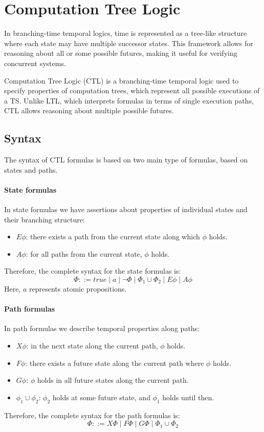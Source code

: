 \section{Computation Tree Logic}

In branching-time temporal logics, time is represented as a tree-like structure where each state may have multiple successor states. 
This framework allows for reasoning about all or some possible futures, making it useful for verifying concurrent systems.

Computation Tree Logic (CTL) is a branching-time temporal logic used to specify properties of computation trees, which represent all possible executions of a TS. 
Unlike LTL, which interprets formulas in terms of single execution paths, CTL allows reasoning about multiple possible futures.

\subsection{Syntax}
The syntax of CTL formulas is based on two main type of formulas, based on states and paths. 

\paragraph*{State formulas}
In state formulas we have assertions about properties of individual states and their branching structure: 
\begin{itemize}
    \item $E\phi$: there exists a path from the current state along which $\phi$ holds.
    \item $A\phi$: for all paths from the current state, $\phi$ holds.
\end{itemize}
\noindent Therefore, the complete syntax for the state formulas is:
\[\Phi ::= true \mid a \mid \lnot \Phi \mid \Phi_1\cup \Phi_2 \mid E\phi \mid A\phi\]
\noindent Here, $a$ represents atomic propositions.

\paragraph*{Path formulas}
In path formulas we describe temporal properties along paths: 
\begin{itemize}
    \item $X\phi$: in the next state along the current path, $\phi$ holds.
    \item $F\phi$: there exists a future state along the current path where $\phi$ holds.
    \item $G\phi$: $\phi$ holds in all future states along the current path.
    \item $\phi_1 \cup \phi_2$: $\phi_2$ holds at some future state, and $\phi_1$ holds until then.
\end{itemize}
\noindent Therefore, the complete syntax for the path formulas is:
\[\Phi ::= X \Phi \mid F\Phi\mid G\Phi \mid\Phi_1\cup\Phi_2\]

